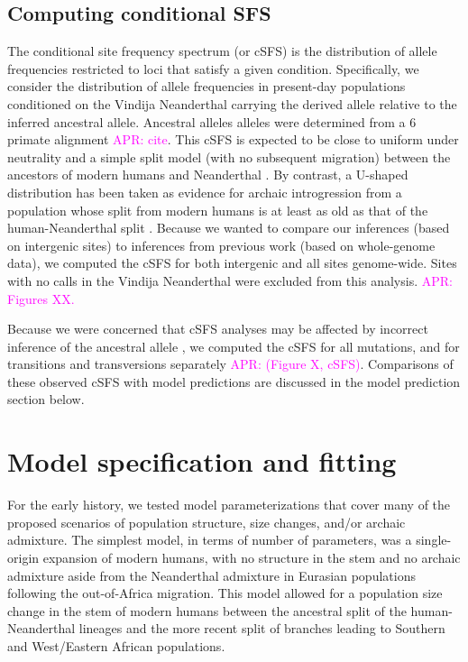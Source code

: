 \documentclass[]{article}
\newcommand{\aprcomment}[1]{{\textcolor{magenta}{APR: #1}}}
\begin{document}
\subsection{Computing conditional SFS}\label{sec:computing-csfs}

The conditional site frequency spectrum (or cSFS) is the distribution of allele
frequencies restricted to loci that satisfy a given condition. Specifically, we
consider the distribution of allele frequencies in present-day populations
conditioned on the Vindija Neanderthal carrying the derived allele relative to
the inferred ancestral allele. Ancestral alleles alleles were determined from a
6 primate alignment \aprcomment{cite}. This cSFS is expected to be close to
uniform under neutrality and a simple split model (with no subsequent
migration) between the ancestors of modern humans and Neanderthal
\citep{Chen2007-iy}. By contrast, a U-shaped distribution has been taken as
evidence for archaic introgression from a population whose split from modern
humans is at least as old as that of the human-Neanderthal split
\citet{Durvasula2020-td,Yang2012-ze}. Because we wanted to compare our
inferences (based on intergenic sites) to inferences from previous work (based
on whole-genome data), we computed the cSFS for both intergenic and all sites
genome-wide. Sites with no calls in the Vindija Neanderthal were excluded from
this analysis. \aprcomment{Figures XX.}

Because we were concerned that cSFS analyses may be affected by incorrect
inference of the ancestral allele \cite{Hernandez2007-mf}, we computed the cSFS
for all mutations, and for transitions and transversions separately
\aprcomment{(Figure X, cSFS)}. Comparisons of these observed cSFS with model
predictions are discussed in the model prediction section below. 

\section{Model specification and fitting}

For the early history, we tested model parameterizations that cover many of the
proposed scenarios of population structure, size changes, and/or archaic
admixture. The simplest model, in terms of number of parameters, was a
single-origin expansion of modern humans, with no structure in the stem and no
archaic admixture aside from the Neanderthal admixture in Eurasian populations
following the out-of-Africa migration. This model allowed for a population size
change in the stem of modern humans between the ancestral split of the
human-Neanderthal lineages and the more recent split of branches leading to
Southern and West/Eastern African populations.
\end{document}
